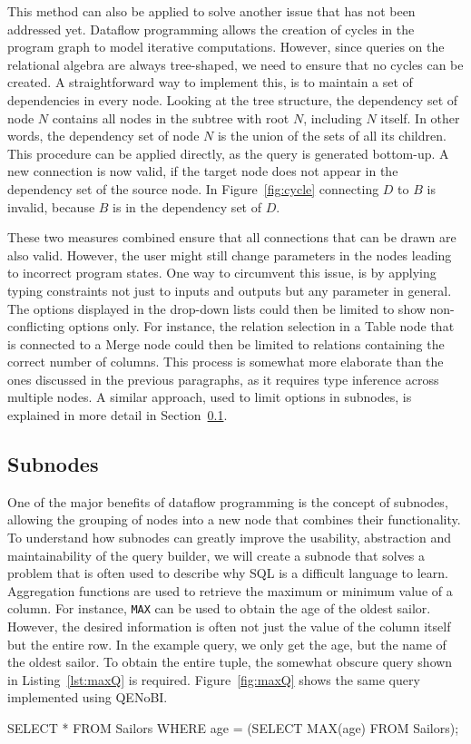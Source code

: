 \documentclass[11pt,a4paper]{globis-book}
\begin{document}
This method can also be applied to solve another issue that has not been addressed yet. Dataflow programming allows the creation of cycles in the program graph to model iterative computations. However, since queries on the relational algebra are always tree-shaped, we need to ensure that no cycles can be created. A straightforward way to implement this, is to maintain a set of dependencies in every node. Looking at the tree structure, the dependency set of node $N$ contains all nodes in the subtree with root $N$, including $N$ itself. In other words, the dependency set of node $N$ is the union of the sets of all its children. This procedure can be applied directly, as the query is generated bottom-up. A new connection is now valid, if the target node does not appear in the dependency set of the source node. In Figure~\ref{fig:cycle} connecting $D$ to $B$ is invalid, because $B$ is in the dependency set of $D$.

These two measures combined ensure that all connections that can be drawn are also valid. However, the user might still change parameters in the nodes leading to incorrect program states. One way to circumvent this issue, is by applying typing constraints not just to inputs and outputs but any parameter in general. The options displayed in the drop-down lists could then be limited to show non-conflicting options only. For instance, the relation selection in a Table node that is connected to a Merge node could then be limited to relations containing the correct number of columns. This process is somewhat more elaborate than the ones discussed in the previous paragraphs, as it requires type inference across multiple nodes. A similar approach, used to limit options in subnodes, is explained in more detail in Section~\ref{sec:subnodes}.

\subsection{Subnodes}
\label{sec:subnodes}
One of the major benefits of dataflow programming is the concept of subnodes, allowing the grouping of nodes into a new node that combines their functionality. To understand how subnodes can greatly improve the usability, abstraction and maintainability of the query builder, we will create a subnode that solves a problem that is often used to describe why SQL is a difficult language to learn. Aggregation functions are used to retrieve the maximum or minimum value of a column. For instance, \texttt{MAX} can be used to obtain the age of the oldest sailor. However, the desired information is often not just the value of the column itself but the entire row. In the example query, we only get the age, but the name of the oldest sailor. To obtain the entire tuple, the somewhat obscure query shown in Listing~\ref{lst:maxQ} is required. Figure~\ref{fig:maxQ} shows the same query implemented using QENoBI.
\begin{codeex}[caption=Retrieve oldest sailor in SQL, label=lst:maxQ]
SELECT *
FROM Sailors
WHERE age = (SELECT MAX(age) FROM Sailors);
\end{codeex}
\end{document}
